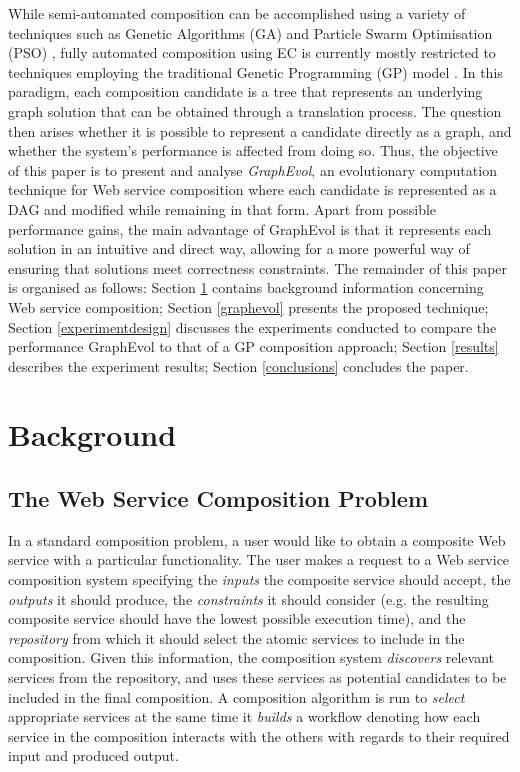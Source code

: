 \documentclass{article}
\begin{document}
While semi-automated composition can be accomplished using a variety of techniques such as Genetic Algorithms (GA) and Particle Swarm Optimisation
(PSO) \cite{wang2012survey}, fully automated composition using EC is currently mostly restricted to techniques employing the traditional Genetic Programming (GP) model \cite{rodriguez2010composition}.
In this paradigm, each composition candidate is a tree that represents an underlying graph solution that can be obtained through a translation
process. The question then arises whether it is possible to represent a candidate directly as a graph, and whether the system's performance is affected
from doing so. Thus, the objective of this paper is to present and analyse \textit{GraphEvol}, an evolutionary computation technique for Web service
composition where each candidate is represented as a DAG and modified while remaining in that form. Apart from possible performance gains, the main
advantage of GraphEvol is that it represents each solution in an intuitive and direct way, allowing for a more powerful way of ensuring that solutions
meet correctness constraints. The remainder of this paper is organised as follows:
Section \ref{background} contains background information concerning Web service composition; Section \ref{graphevol} presents the proposed technique;
Section \ref{experimentdesign} discusses the experiments conducted to compare the performance GraphEvol to that of a GP composition approach;
Section \ref{results} describes the experiment results; Section \ref{conclusions} concludes the paper.

\section{Background}\label{background}

\subsection{The Web Service Composition Problem}

In a standard composition problem, a user would like to obtain a composite Web service with a particular functionality. The user makes a request to a Web
service composition system specifying the \textit{inputs} the composite service should accept, the \textit{outputs} it should produce, the \textit{constraints}
it should consider (e.g. the resulting composite service should have the lowest possible execution time), and the \textit{repository} from which it should select
the atomic services to include in the composition. Given this information, the composition system \textit{discovers} relevant services from the repository, and uses
these services as potential candidates to be included in the final composition. A composition algorithm is run to \textit{select} appropriate services at the same
time it \textit{builds} a workflow denoting how each service in the composition interacts with the others with regards to their required input and produced output.
\end{document}
